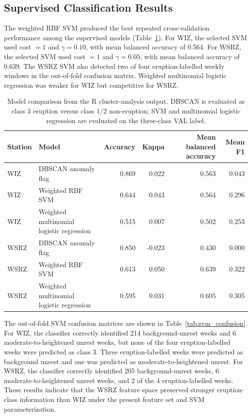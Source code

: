 \documentclass[journal]{IEEEtran}
\begin{document}
\subsection{Supervised Classification Results}
The weighted RBF SVM produced the best repeated cross-validation performance among the supervised models (Table~\ref{tab:model_comparison}). For WIZ, the selected SVM used cost $=1$ and $\gamma=0.10$, with mean balanced accuracy of 0.564. For WSRZ, the selected SVM used cost $=1$ and $\gamma=0.05$, with mean balanced accuracy of 0.639. The WSRZ SVM also detected two of four eruption-labelled weekly windows in the out-of-fold confusion matrix. Weighted multinomial logistic regression was weaker for WIZ but competitive for WSRZ.

\begin{table}[!t]
\centering
\caption{Model comparison from the R cluster-analysis output. DBSCAN is evaluated as class 3 eruption versus class 1/2 non-eruption; SVM and multinomial logistic regression are evaluated on the three-class VAL label.}
\label{tab:model_comparison}
\begin{tabular}{llrrrr}
\toprule
Station & Model & Accuracy & Kappa & Mean balanced accuracy & Mean F1 \\
\midrule
WIZ  & DBSCAN anomaly flag & 0.869 & 0.022 & 0.563 & 0.043 \\
WIZ  & Weighted RBF SVM & 0.644 & 0.043 & 0.564 & 0.296 \\
WIZ  & Weighted multinomial logistic regression & 0.515 & 0.007 & 0.502 & 0.253 \\
WSRZ & DBSCAN anomaly flag & 0.850 & -0.023 & 0.430 & 0.000 \\
WSRZ & Weighted RBF SVM & 0.613 & 0.050 & 0.639 & 0.322 \\
WSRZ & Weighted multinomial logistic regression & 0.595 & 0.031 & 0.605 & 0.305 \\
\bottomrule
\end{tabular}
\end{table}

The out-of-fold SVM confusion matrices are shown in Table~\ref{tab:svm_confusion}. For WIZ, the classifier correctly identified 214 background-unrest weeks and 6 moderate-to-heightened unrest weeks, but none of the four eruption-labelled weeks were predicted as class 3. Three eruption-labelled weeks were predicted as background unrest and one was predicted as moderate-to-heightened unrest. For WSRZ, the classifier correctly identified 205 background-unrest weeks, 6 moderate-to-heightened unrest weeks, and 2 of the 4 eruption-labelled weeks. These results indicate that the WSRZ feature space preserved stronger eruption-class information than WIZ under the present feature set and SVM parameterization.
\end{document}
